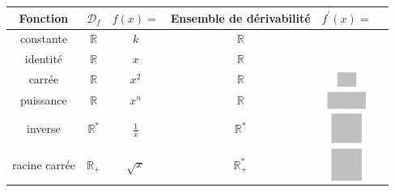 \documentclass[12pt]{article}
\theoremstyle{break}
\begin{document}
\begin{proposition}{}{}
\begin{center}
  \renewcommand{\arraystretch}{3.6}
  \setlength{\extrarowheight}{-3pt}
  \centering
  \begin{tabular}{|c|c|c|c|c|N}
  \hline
  Fonction & $\mathcal{D}_{f}$ & $f(x)=$ & Ensemble de dérivabilité & $f^{\prime}(x)=$ &\\
  \hline
  constante & $\mathbb{R}$ & $k$ & $\mathbb{R}$ &  &\\
  \hline
  identité & $\mathbb{R}$ & $x$ & $\mathbb{R}$ &  &\\
  \hline
  carrée & $\mathbb{R}$ & $x^{2}$ & $\mathbb{R}$ & $\hideM{2 x}$ &\\
  \hline
  puissance & $\mathbb{R}$ & $x^{n}$ & $\mathbb{R}$ & $\hideM{n x^{n-1}}$ &\\
  \hline
  inverse & $\mathbb{R}^{*}$ & $\frac{1}{x}$ & $\mathbb{R}^{*}$ & $\hideM{-\dfrac{1}{x^{2}}}$ &\\
  \hline
  racine carrée & $\mathbb{R}_{+}$ & $\sqrt{x}$ & $\mathbb{R}_{+}^{*}$ & $\hideM{\dfrac{1}{2 \sqrt{x}}}$ &\\
  \hline
  \end{tabular}
\end{center}
\end{proposition}

\newpage
\end{document}
